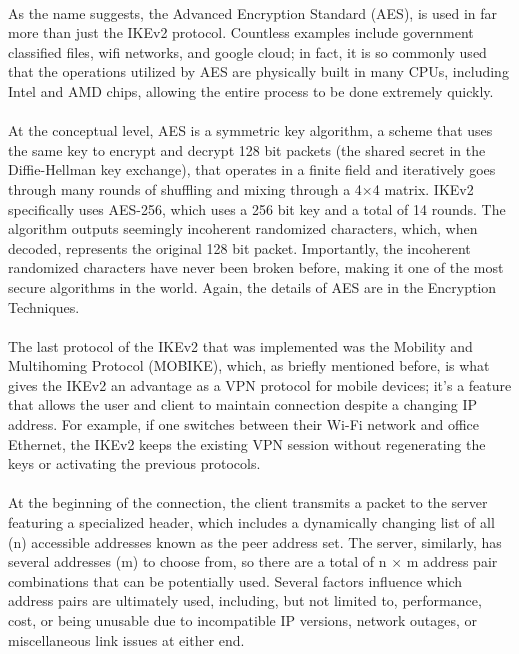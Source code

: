 \documentclass[runningheads]{llncs}
\begin{document}
 \\
 As the name suggests, the Advanced Encryption Standard (AES), is used in far more than just the IKEv2 protocol. Countless examples include government classified files, wifi networks, and google cloud; in fact, it is so commonly used that the operations utilized by AES are physically built in many CPUs, including Intel and AMD chips, allowing the entire process to be done extremely quickly.\\
 \\
 At the conceptual level, AES is a symmetric key algorithm, a scheme that uses the same key to encrypt and decrypt 128 bit packets (the shared secret in the Diffie-Hellman key exchange), that operates in a finite field and iteratively goes through many rounds of shuffling and mixing through a 4$\times$4 matrix. IKEv2 specifically uses AES-256, which uses a 256 bit key and a total of 14 rounds. The algorithm outputs seemingly incoherent randomized characters, which, when decoded, represents the original 128 bit packet. Importantly, the incoherent randomized characters have never been broken before, making it one of the most secure algorithms in the world. Again, the details of AES are in the Encryption Techniques.\\
 \\
The last protocol of the IKEv2 that was implemented was the Mobility and Multihoming Protocol (MOBIKE), which, as briefly mentioned before, is what gives the IKEv2 an advantage as a VPN protocol for mobile devices; it’s a feature that allows the user and client to maintain connection despite a changing IP address. For example, if one switches between their Wi-Fi network and office Ethernet, the IKEv2 keeps the existing VPN session without regenerating the keys or activating the previous protocols.\\
\\
At the beginning of the connection, the client transmits a packet to the server featuring a specialized header, which includes a dynamically changing list of all (n) accessible addresses known as the peer address set. The server, similarly, has several addresses (m) to choose from, so there are a total of n × m address pair combinations that can be potentially used.  Several factors influence which address pairs are ultimately used, including, but not limited to, performance, cost, or being unusable due to incompatible IP versions, network outages, or miscellaneous link issues at either end.\\
\\
\end{document}
